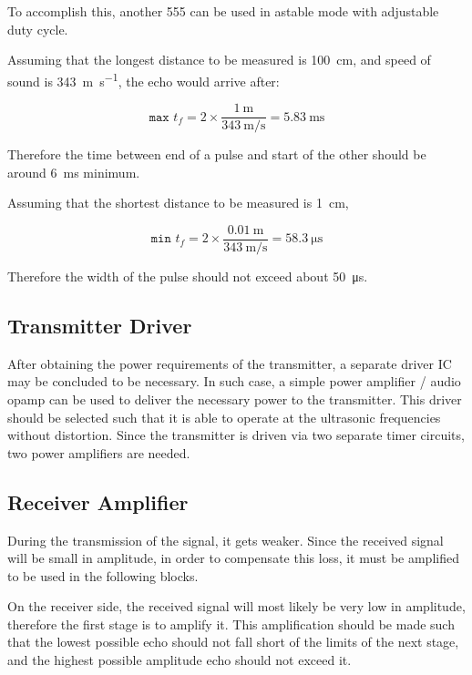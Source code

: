 \documentclass[12pt, a4paper]{article}
\begin{document}
	\bigskip
	To accomplish this, another 555 can be used in astable mode with adjustable duty cycle.
	
	\bigskip
	 Assuming that the longest distance to be measured is \SI{100}{\centi\metre}, and speed of sound is \SI{343}{\metre\per\second}, the echo would arrive after:

    \begin{equation}
        \texttt{max }t_f = 2 \times \frac{\SI{1}{\metre}}{\SI{343}{\metre\per\second}} = \SI{5.83}{\milli\second}
    \end{equation}

    \noindent Therefore the time between end of a pulse and start of the other should be around \SI{6}{\milli\second} minimum. 

    \noindent Assuming that the shortest distance to be measured is \SI{1}{\centi\metre}, 

    \begin{equation}
        \texttt{min }t_f = 2 \times \frac{\SI{0.01}{\metre}}{\SI{343}{\metre\per\second}} = \SI{58.3}{\micro\second}
    \end{equation}

    \noindent Therefore the width of the pulse should not exceed about \SI{50}{\micro\second}.


	\subsection{Transmitter Driver}
	After obtaining the power requirements of the transmitter, a separate driver IC may be concluded to be necessary. In such case, a simple power amplifier / audio opamp can be used to deliver the necessary power to the transmitter. This driver should be selected such that it is able to operate at the ultrasonic frequencies without distortion. Since the transmitter is driven via two separate timer circuits, two power amplifiers are needed. 
	
	\subsection{Receiver Amplifier}
	During the transmission of the signal, it gets weaker. Since the received signal will be small in amplitude, in order to compensate this loss, it must be amplified to be used in the following blocks.
	
	 \bigskip
    On the receiver side, the received signal will most likely be very low in amplitude, therefore the first stage is to amplify it. This amplification should be made such that the lowest possible echo should not fall short of the limits of the next stage, and the highest possible amplitude echo should not exceed it.
\end{document}
